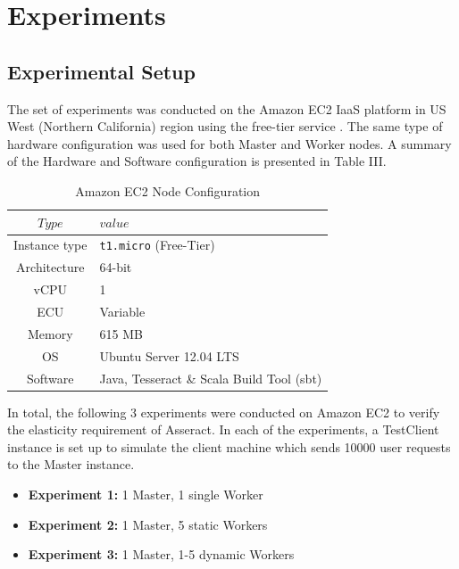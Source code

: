 \documentclass[conference]{IEEEtran}
\begin{document}
\section{Experiments}\label{sec:experiment}

\subsection{Experimental Setup}\label{sec:experimentsetup}
The set of experiments was conducted on the Amazon EC2 IaaS platform in US West (Northern California) region using the free-tier service \cite{ec2node}. The same type of hardware configuration was used for both Master and Worker nodes. A summary of the Hardware and Software configuration is presented in Table III.

\begin{table}[H]
\renewcommand{\arraystretch}{1.3}
\caption{Amazon EC2 Node Configuration}\label{tab:ec2node}
\centering
\begin{tabular*}{8cm}{c|p{5cm}}
    \hline
    $Type$&$value$\\
    \hline
    Instance type & \texttt{t1.micro} (Free-Tier) \\
    Architecture & 64-bit \\
    vCPU & 1 \\
    ECU & Variable \\
    Memory & 615 MB \\
    OS & Ubuntu Server 12.04 LTS \\
    Software & Java, Tesseract \& Scala Build Tool (sbt) \\
    \hline
\end{tabular*}
\end{table}

In total, the following 3 experiments were conducted on Amazon EC2 to verify the elasticity requirement of Asseract. In each of the experiments, a TestClient instance is set up to simulate the client machine which sends 10000 user requests to the Master instance.


\begin{itemize}
  \item \textbf{Experiment 1:} 1 Master, 1 single Worker
  \item \textbf{Experiment 2:} 1 Master, 5 static Workers
  \item \textbf{Experiment 3:} 1 Master, 1-5 dynamic Workers \\
\end{itemize} 
\end{document}
